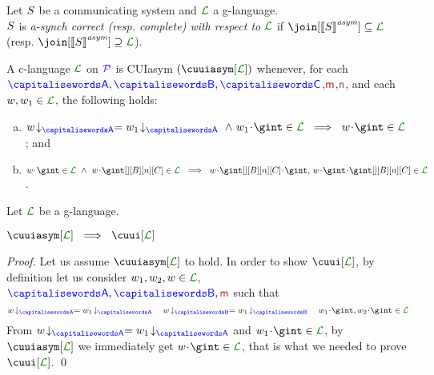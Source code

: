 \begin{definition}\label{def:cc}
  Let $S$ be a communicating system and $\clang$ a g-language.\\
  $S$ is \emph{a-synch correct (resp. complete) with respect to
    $\clang$} if $\join[{\asem{\aCS}}]\subseteq \clang$ (resp. 
  $\join[{\asem{\aCS}}]\supseteq \clang$).
\end{definition}


\begin{definition}[CUIasym]
\label{def:cuiasym}
A c-language $\clang$ on $\mathcal{\color{blue}{P}}$ is CUIasym $(\cuuiasym[\clang])$ whenever,
 for each $\p,\q,\ptp[C]$,$\msg[m]$,$\msg[n]$, and each $\acword, \acword_1\in\clang$, the following holds:
 \begin{enumerate}[a)]
  \item
$\proj{\acword}{A} = \proj{\acword_1}{A}\ \land\  \acword_1\cat\gint\in\clang\ \implies\ \acword\cat\gint\in\clang$; and
 \item
 $\acword\cat\gint\in\clang\ \land\ \acword\cat\gint[][B][n][C]\in\clang\   \implies\
 \acword\cat\gint[][B][n][C]\cat\gint,\, \acword\cat\gint\cat\gint[][B][n][C]\in\clang$.
\end{enumerate}
\end{definition}

\begin{proposition}
Let $\clang$ be a g-language.\\
\centerline{$\cuuiasym[{\clang}]\ \implies\ \cuui[\clang]$}
\end{proposition}
\begin{proof}
Let us assume $\cuuiasym[{\clang}]$ to hold. In order to show  $\cuui[{\clang}]$, 
by definition let us consider $\acword_1,\acword_2,\acword\in\clang$, $\p,\q,\msg$ such that
$$\proj{\acword}{A} =\proj{\acword_1}{A}\quad \proj{\acword}{B} =\proj{\acword_1}{B}
\quad \acword_1\cat\gint, \acword_2\cat\gint\in\clang$$
From $\proj{\acword}{A} =\proj{\acword_1}{A}$ and $\acword_1\cat\gint\in\clang$,
by $\cuuiasym[{\clang}]$ we immediately get  $\acword\cat\gint\in\clang$, that is what we needed to
prove $\cuui[\clang]$.
\qed
\end{proof}


